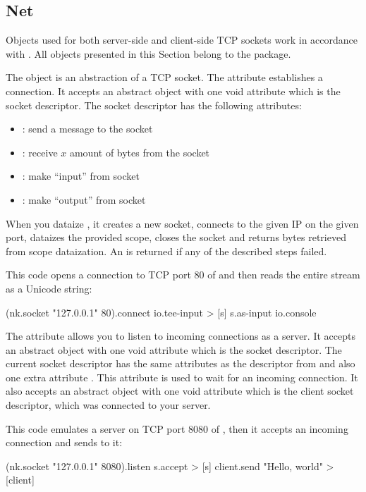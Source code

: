 
\subsection{Net}\label{sec:sockets}

Objects used for both server-side and client-side TCP sockets
  work in accordance with \citet{posix}.
All objects presented in this Section belong to the  package.

The  object is an abstraction of a TCP socket.
The  attribute establishes a connection.
It accepts an abstract object with one void attribute which is the socket descriptor.
The socket descriptor has the following attributes:

\begin{itemize}
    \item {}: send a message to the socket
    \item {}: receive \(x\) amount of bytes from the socket
    \item {}: make ``input'' from socket
    \item {}: make ``output'' from socket
\end{itemize}

When you dataize , it creates a new socket,
  connects to the given IP on the given port, dataizes the provided scope,
  closes the socket and returns bytes retrieved from scope dataization.
An  is returned if any of the described steps failed.

This code opens a connection to TCP port 80 of  and
  then reads the entire stream as a Unicode string:

\begin{ffcode}
(nk.socket "127.0.0.1" 80).connect
  io.tee-input > [s]
    s.as-input
    io.console
\end{ffcode}

The  attribute allows you to listen to incoming connections as a server.
It accepts an abstract object with one void attribute which is the socket descriptor.
The current socket descriptor has the same attributes as the descriptor
  from  and also one extra attribute .
This attribute is used to wait for an incoming connection.
It also accepts an abstract object with one void attribute
  which is the client socket descriptor, which was connected to your server.

This code emulates a server on TCP port 8080 of ,
  then it accepts an incoming connection and sends  to it:

\begin{ffcode}
(nk.socket "127.0.0.1" 8080).listen
  s.accept > [s]
    client.send "Hello, world" > [client]
\end{ffcode}
